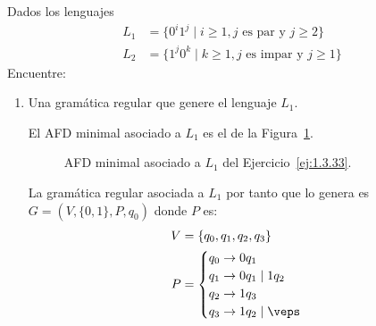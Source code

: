 \begin{ejercicio}\label{ej:1.3.33}
    Dados los lenguajes
    \begin{align*}
        L_1 &= \{0^i 1^j \mid i\geq 1, j\text{ es par y } j\geq 2\}\\
        L_2 &= \{1^j 0^k \mid k\geq 1, j\text{ es impar y } j\geq 1\}
    \end{align*}
    Encuentre:
    \begin{enumerate}
        \item Una gramática regular que genere el lenguaje $L_1$.
        
        El AFD minimal asociado a $L_1$ es el de la Figura~\ref{fig:1.3.33-L1}.
        \begin{figure}
            \centering
            \caption{AFD minimal asociado a $L_1$ del Ejercicio~\ref{ej:1.3.33}.}
            \label{fig:1.3.33-L1}
        \end{figure}

        La gramática regular asociada a $L_1$ por tanto que lo genera es $G=(V,\{0,1\},P,q_0)$ donde $P$ es:
        \begin{align*}
            V &= \{q_0,q_1,q_2,q_3\}\\
            P &= \begin{cases}
                q_0\rightarrow 0q_1\\
                q_1\rightarrow 0q_1\mid 1q_2\\
                q_2\rightarrow 1q_3 \\
                q_3\rightarrow 1q_2 \mid \veps
            \end{cases}
        \end{align*}
        


\end{enumerate}
\end{ejercicio}
